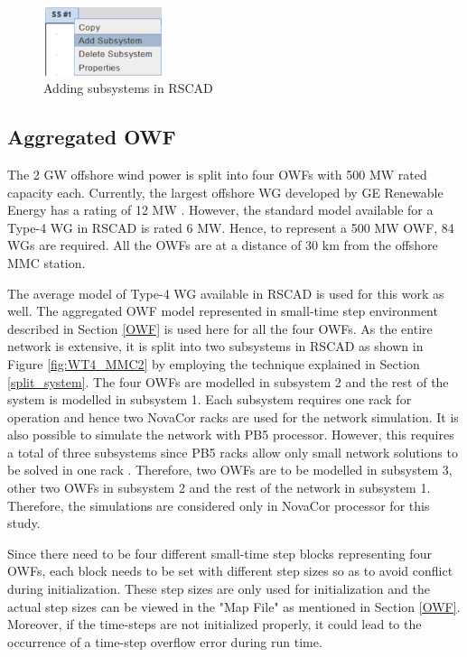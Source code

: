 \begin{figure}[H]
\centering
    \includegraphics[height = 2cm,width = 3.5cm]{Diagrams/Chapter_3/Subsystem.PNG}
    \caption{Adding subsystems in RSCAD}
    \label{fig:subsystem_RSCAD}
\end{figure}

\subsection{Aggregated OWF}\label{Aggregated_OWF_large_scale}
The 2 GW offshore wind power is split into four \gls{OWF}s with 500 MW rated capacity each. Currently, the largest offshore \gls{WG} developed by GE Renewable Energy has a rating of 12 MW \cite{noauthor_worlds_nodate}. However, the standard model available for a Type-4 \gls{WG} in RSCAD is rated 6 MW. Hence, to represent a 500 MW \gls{OWF}, 84 \gls{WG}s are required. All the \gls{OWF}s are at a distance of 30 km from the offshore \gls{MMC} station. 


The average model of Type-4 \gls{WG} available in RSCAD is used for this work as well. The aggregated \gls{OWF} model represented in small-time step environment described in Section \ref{OWF} is used here for all the four \gls{OWF}s. As the entire network is extensive, it is split into two subsystems in RSCAD as shown in Figure \ref{fig:WT4_MMC2} by employing the technique explained in Section \ref{split_system}. The four \gls{OWF}s are modelled in subsystem 2 and the rest of the system is modelled in subsystem 1. Each subsystem requires one rack for operation and hence two NovaCor racks are used for the network simulation. It is also possible to simulate the network with PB5 processor. However, this requires a total of three subsystems since PB5 racks allow only small network solutions to be solved in one rack \cite{noauthor_pb5_nodate}. Therefore, two \gls{OWF}s are to be modelled in subsystem 3, other two \gls{OWF}s in subsystem 2 and the rest of the network in subsystem 1. Therefore, the simulations are considered only in NovaCor processor for this study.  


Since there need to be four different small-time step blocks representing four \gls{OWF}s, each block needs to be set with different step sizes so as to avoid conflict during initialization. These step sizes are only used for initialization and the actual step sizes can be viewed in the "Map File" as mentioned in Section \ref{OWF}. Moreover, if the time-steps are not initialized properly, it could lead to the occurrence of a time-step overflow error during run time. 


